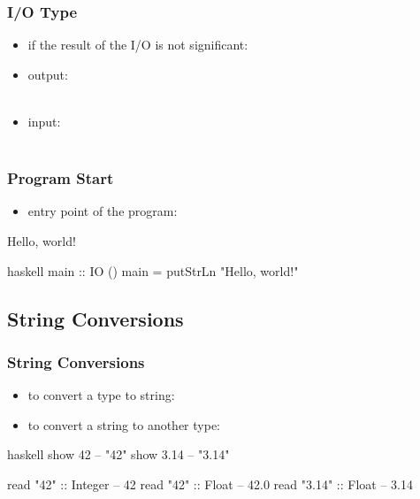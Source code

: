 \documentclass[dvipsnames]{beamer}
\theoremstyle{plain}
\begin{document}
\begin{frame}
  \frametitle{I/O Type}

  \begin{itemize}
    \item if the result of the I/O is not significant: 

    \medskip
    \item output:\\
      \smallskip
      \\

    \smallskip
    \item input:\\
      \smallskip
      \\
  \end{itemize}
\end{frame}

\begin{frame}[fragile]
  \frametitle{Program Start}

  \begin{itemize}
    \item entry point of the program: 
  \end{itemize}

  \begin{exampleblock}{Hello, world!}
    \begin{pygments}{haskell}
main :: IO ()
main = putStrLn "Hello, world!"
    \end{pygments}
  \end{exampleblock}
\end{frame}

\subsection{String Conversions}

\begin{frame}[fragile]
  \frametitle{String Conversions}

  \begin{itemize}
    \item to convert a type to string: 
    \item to convert a string to another type: 
  \end{itemize}

  \begin{exampleblock}{}
    \begin{pygments}{haskell}
show 42    -- "42"
show 3.14  -- "3.14"

read "42" :: Integer  -- 42
read "42" :: Float    -- 42.0
read "3.14" :: Float  -- 3.14
    \end{pygments}
  \end{exampleblock}
\end{frame}
\end{document}

